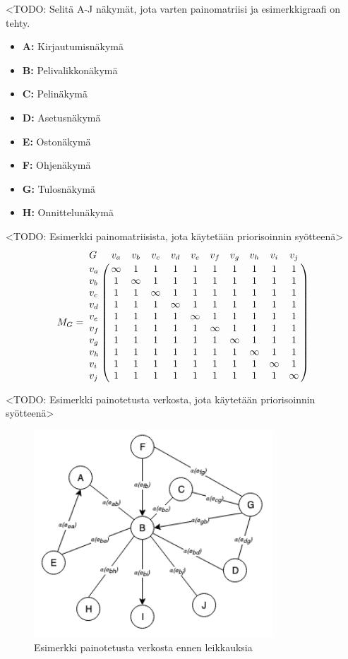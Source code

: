   <TODO: Selitä A-J näkymät, jota varten painomatriisi ja esimerkkigraafi on tehty.
  \begin{itemize}
    \item \textbf{A:} Kirjautumisnäkymä
    \item \textbf{B:} Pelivalikkonäkymä
    \item \textbf{C:} Pelinäkymä
    \item \textbf{D:} Asetusnäkymä
    \item \textbf{E:} Ostonäkymä
    \item \textbf{F:} Ohjenäkymä
    \item \textbf{G:} Tulosnäkymä
    \item \textbf{H:} Onnittelunäkymä
  \end{itemize}

  <TODO: Esimerkki painomatriisista, jota käytetään priorisoinnin syötteenä>
  \[
    M_G =
    \bordermatrix{
      G & v_a & v_b & v_c & v_d & v_e & v_f & v_g & v_h & v_i & v_j \cr
      v_a & \infty & 1 & 1 & 1 & 1 & 1 & 1 & 1 & 1 & 1 \cr
      v_b & 1 & \infty & 1 & 1 & 1 & 1 & 1 & 1 & 1 & 1 \cr
      v_c & 1 & 1 & \infty & 1 & 1 & 1 & 1 & 1 & 1 & 1 \cr
      v_d & 1 & 1 & 1 & \infty & 1 & 1 & 1 & 1 & 1 & 1 \cr
      v_e & 1 & 1 & 1 & 1 & \infty & 1 & 1 & 1 & 1 & 1 \cr
      v_f & 1 & 1 & 1 & 1 & 1 & \infty & 1 & 1 & 1 & 1 \cr
      v_g & 1 & 1 & 1 & 1 & 1 & 1 & \infty & 1 & 1 & 1 \cr
      v_h & 1 & 1 & 1 & 1 & 1 & 1 & 1 & \infty & 1 & 1 \cr
      v_i & 1 & 1 & 1 & 1 & 1 & 1 & 1 & 1 & \infty & 1 \cr
      v_j & 1 & 1 & 1 & 1 & 1 & 1 & 1 & 1 & 1 & \infty \cr
    }
  \]

  <TODO: Esimerkki painotetusta verkosta, jota käytetään priorisoinnin syötteenä>
  \begin{figure}[H]
    \centering
    \includegraphics[width=0.8\textwidth]{assets/painotettu-verkko-ennen.png}
    \caption{Esimerkki painotetusta verkosta ennen leikkauksia}
    \label{fig:painotettu-verkko-ennen}
  \end{figure}

